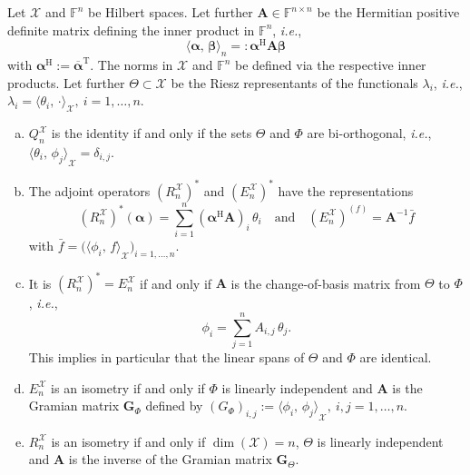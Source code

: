 \documentclass[a4paper]{paper}
\newcommand{\Spc}[1]{\mathscr{#1}}
\newcommand{\Field}{\mathbb{F}}
\newcommand*{\EXT}[2]{\ensuremath{E_{#1}^{#2}}}
\newcommand*{\REST}[2]{\ensuremath{R_{#1}^{#2}}}
\newcommand*{\COPROJ}[2]{\ensuremath{Q_{#1}^{#2}}}
\newcommand*{\RnX}{\ensuremath{\REST{n}{\Spc{X}}}}
\newcommand*{\EnX}{\ensuremath{\EXT{n}{\Spc{X}}}}
\newcommand*{\QnX}{\ensuremath{\COPROJ{n}{\Spc{X}}}}
\DeclareMathOperator{\DIM}{dim}
\newcommand*{\INNER}[2]{\ensuremath{\langle #1,\,#2\rangle}}
\newcommand*{\TRANSP}[1]{{\ensuremath{#1^{\mathrm{T}}}}}
\newcommand*{\HERM}[1]{{\ensuremath{#1^{\mathrm{H}}}}}
\newcommand{\ie}{\textsl{i.e.}\xspace}
\newcommand{\valpha}{\boldsymbol{\alpha}}
\newcommand{\vbeta}{\boldsymbol{\beta}}
\newcommand{\vA}{\boldsymbol{A}}
\newcommand{\vG}{\boldsymbol{G}}
\begin{document}
\begin{lemma}
 \label{lemma:specif:funct:op_prop_hilbert}
 Let $\Spc{X}$ and $\Field^n$ be Hilbert spaces. Let further $\vA \in \Field^{n\times n}$ be the Hermitian positive 
 definite matrix defining the inner product in $\Field^n$, \ie,
 \begin{equation*}
  \INNER{\valpha}{\vbeta}_n =: \HERM{\valpha} \vA \vbeta
 \end{equation*}
 with $\HERM{\valpha} := \TRANSP{\overline{\valpha}}$. The norms in $\Spc{X}$ and $\Field^n$ be defined via 
 the respective inner products. Let further $\Theta \subset \Spc{X}$ be the Riesz representants of the functionals 
 $\lambda_i$, \ie,  $\lambda_i = \INNER{\theta_i}{\cdot}_{\Spc{X}},\ i=1,\ldots,n$.
 \begin{enumerate}[(a)]
  \item \label{lemma:specif:funct:op_prop_hilbert:Q_identity}
  $\QnX$ is the identity if and only if the sets $\Theta$ and $\Phi$ are bi-orthogonal, \ie, 
  $\INNER{\theta_i}{\phi_j}_{\Spc{X}} = \delta_{i,j}$.
 
  \item \label{lemma:specif:funct:op_prop_hilbert:R_adjoint_repr}
  The adjoint operators $(\RnX)^*$ and $(\EnX)^*$ have the representations
  \begin{equation*}
   (\RnX)^*(\valpha) = \sum_{i=1}^n (\HERM{\valpha}\vA)_i\, \theta_i
   \quad \text{and} \quad
   (\EnX)^(f) = \vA^{-1} \bar f
  \end{equation*}
  with $\bar f = \big( \INNER{\phi_i}{f}_{\Spc{X}} \big)_{i=1,\ldots,n}$.
  
  \item \label{lemma:specif:funct:op_prop_hilbert:adjoint_relation}
  It is $(\RnX)^* = \EnX$ if and only if $\vA$ is the change-of-basis matrix from $\Theta$ to $\Phi$, \ie,
  \begin{equation*}
   \phi_i = \sum_{j=1}^n A_{i,j}\, \theta_j.
  \end{equation*}
  This implies in particular that the linear spans of $\Theta$ and $\Phi$ are identical.
 
  \item  \label{lemma:specif:funct:op_prop_hilbert:E_isometry}
  $\EnX$ is an isometry if and only if $\Phi$ is linearly independent and $\vA$ is the Gramian matrix $\vG_\Phi$ 
  defined by $(G_\Phi)_{i,j} := \INNER{\phi_i}{\phi_j}_{\Spc{X}},\ i,j=1,\ldots,n$.
  
  \item \label{lemma:specif:funct:op_prop_hilbert:R_isometry}
  $\RnX$ is an isometry if and only if $\DIM(\Spc{X}) = n$, $\Theta$ is linearly independent and $\vA$ is the 
  inverse of the Gramian matrix $\vG_\Theta$.
 \end{enumerate}
\end{lemma}
\vspace{1em}
\end{document}
